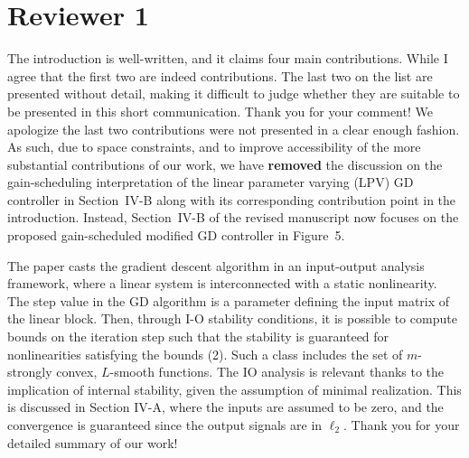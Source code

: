 \section*{Reviewer 1}\label{sec:reviewer1}
\renewcommand{\theequation}{R1.\arabic{equation}}
\setcounter{equation}{0}
\begin{rebuttal}[resolved]
    {%
        The introduction is well-written, and it claims four main contributions. While I agree that the first two are indeed contributions. The last two on the list are presented without detail, making it difficult to judge whether they are suitable to be presented in this short communication.
    }%
    {%
        Thank you for your comment! We apologize the last two contributions were not presented in a clear enough fashion. As such, due to space constraints, and to improve accessibility of the more substantial contributions of our work, we have \textbf{removed} the discussion on the gain-scheduling interpretation of the linear parameter varying (LPV) GD controller in Section~IV-B along with its corresponding contribution point in the introduction. Instead, Section~IV-B of the revised manuscript now focuses on the proposed gain-scheduled modified GD controller in Figure~5.
    }%
\end{rebuttal}
\begin{rebuttal}[resolved]
    {%
        The paper casts the gradient descent algorithm in an input-output analysis framework, where a linear system is interconnected with a static nonlinearity. The step value in the GD algorithm is a parameter defining the input matrix of the linear block. Then, through I-O stability conditions, it is possible to compute bounds on the iteration step such that the stability is guaranteed for nonlinearities satisfying the bounds (2). Such a class includes the set of $m$-strongly convex, $L$-smooth functions. The IO analysis is relevant thanks to the implication of internal stability, given the assumption of minimal realization. This is discussed in Section IV-A, where the inputs are assumed to be zero, and the convergence is guaranteed since the output signals are in \(\ell_2\).
    }%
    {%
        Thank you for your detailed summary of our work!
    }%
\end{rebuttal}
